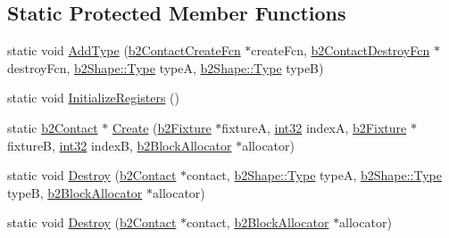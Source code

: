 \subsection*{Static Protected Member Functions}
\begin{DoxyCompactItemize}
\item 
static void \mbox{\hyperlink{classb2_contact_ad905650aab96ead0434c2bb449e4129c}{Add\+Type}} (\mbox{\hyperlink{b2_contact_8h_a8c349419089565d4b718438978e2e098}{b2\+Contact\+Create\+Fcn}} $\ast$create\+Fcn, \mbox{\hyperlink{b2_contact_8h_a13f1fcd7bbd3900e53e6ddf8a76428e7}{b2\+Contact\+Destroy\+Fcn}} $\ast$destroy\+Fcn, \mbox{\hyperlink{classb2_shape_a4c1f3a9ad6b3150bb90ad9018ca4b1e0}{b2\+Shape\+::\+Type}} typeA, \mbox{\hyperlink{classb2_shape_a4c1f3a9ad6b3150bb90ad9018ca4b1e0}{b2\+Shape\+::\+Type}} typeB)
\item 
static void \mbox{\hyperlink{classb2_contact_ac77031d85c2e06d5cdc1f5c774f8f3fd}{Initialize\+Registers}} ()
\item 
static \mbox{\hyperlink{classb2_contact}{b2\+Contact}} $\ast$ \mbox{\hyperlink{classb2_contact_a2de75f3569a0f962cf1e6e1b6384c0a1}{Create}} (\mbox{\hyperlink{classb2_fixture}{b2\+Fixture}} $\ast$fixtureA, \mbox{\hyperlink{b2_settings_8h_a43d43196463bde49cb067f5c20ab8481}{int32}} indexA, \mbox{\hyperlink{classb2_fixture}{b2\+Fixture}} $\ast$fixtureB, \mbox{\hyperlink{b2_settings_8h_a43d43196463bde49cb067f5c20ab8481}{int32}} indexB, \mbox{\hyperlink{classb2_block_allocator}{b2\+Block\+Allocator}} $\ast$allocator)
\item 
static void \mbox{\hyperlink{classb2_contact_a36c1f6767f212f2e4ddb4c4b2c7cdb75}{Destroy}} (\mbox{\hyperlink{classb2_contact}{b2\+Contact}} $\ast$contact, \mbox{\hyperlink{classb2_shape_a4c1f3a9ad6b3150bb90ad9018ca4b1e0}{b2\+Shape\+::\+Type}} typeA, \mbox{\hyperlink{classb2_shape_a4c1f3a9ad6b3150bb90ad9018ca4b1e0}{b2\+Shape\+::\+Type}} typeB, \mbox{\hyperlink{classb2_block_allocator}{b2\+Block\+Allocator}} $\ast$allocator)
\item 
static void \mbox{\hyperlink{classb2_contact_ab57797a25c2206edf1ad7c4dcd1cbca5}{Destroy}} (\mbox{\hyperlink{classb2_contact}{b2\+Contact}} $\ast$contact, \mbox{\hyperlink{classb2_block_allocator}{b2\+Block\+Allocator}} $\ast$allocator)
\end{DoxyCompactItemize}
